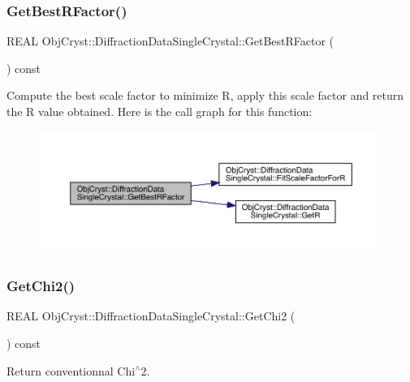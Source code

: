 \subsubsection{\texorpdfstring{GetBestRFactor()}{GetBestRFactor()}}
{\footnotesize\ttfamily R\+E\+AL Obj\+Cryst\+::\+Diffraction\+Data\+Single\+Crystal\+::\+Get\+Best\+R\+Factor (\begin{DoxyParamCaption}{ }\end{DoxyParamCaption}) const\hspace{0.3cm}{\ttfamily [virtual]}}

Compute the best scale factor to minimize R, apply this scale factor and return the R value obtained. Here is the call graph for this function\+:
\nopagebreak
\begin{figure}[H]
\begin{center}
\leavevmode
\includegraphics[width=350pt]{class_obj_cryst_1_1_diffraction_data_single_crystal_a48bf1e9a133db940e2de70a446765914_cgraph}
\end{center}
\end{figure}
\mbox{\label{class_obj_cryst_1_1_diffraction_data_single_crystal_a6525600072e31324bdcb1219f33198cb}} 
\subsubsection{\texorpdfstring{GetChi2()}{GetChi2()}}
{\footnotesize\ttfamily R\+E\+AL Obj\+Cryst\+::\+Diffraction\+Data\+Single\+Crystal\+::\+Get\+Chi2 (\begin{DoxyParamCaption}{ }\end{DoxyParamCaption}) const\hspace{0.3cm}{\ttfamily [virtual]}}



Return conventionnal Chi$^\wedge$2. 

